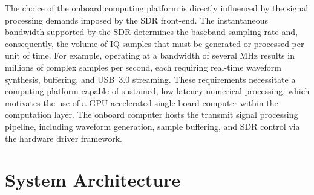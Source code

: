 \documentclass[conference,a4paper]{IEEEtran}
\begin{document}




The choice of the onboard computing platform is directly influenced by the signal processing demands imposed by the SDR front-end. The instantaneous bandwidth supported by the SDR determines the baseband sampling rate and, consequently, the volume of IQ samples that must be generated or processed per unit of time. For example, operating at a bandwidth of several MHz results in millions of complex samples per second, each requiring real-time waveform synthesis, buffering, and USB~3.0 streaming. These requirements necessitate a computing platform capable of sustained, low-latency numerical processing, which motivates the use of a GPU-accelerated single-board computer within the computation layer. The onboard computer hosts the transmit signal processing pipeline, including waveform generation, sample buffering, and SDR control via the hardware driver framework.

\section{System Architecture}
\end{document}
